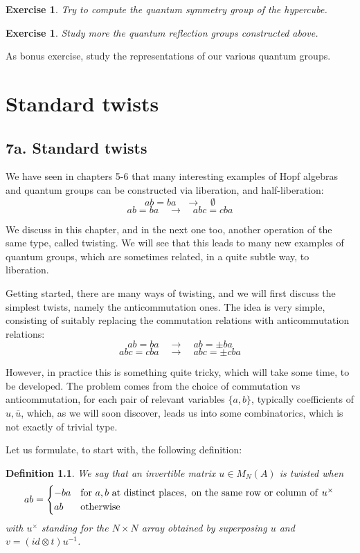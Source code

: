 \documentclass[12pt]{amsbook}
\newtheorem{definition}[theorem]{Definition}
\newtheorem{exercise}[theorem]{Exercise}
\begin{document}
\begin{exercise}
Try to compute the quantum symmetry group of the hypercube.
\end{exercise}

\begin{exercise}
Study more the quantum reflection groups constructed above.
\end{exercise}

As bonus exercise, study the representations of our various quantum groups.

\chapter{Standard twists}

\section*{7a. Standard twists}

We have seen in chapters 5-6 that many interesting examples of Hopf algebras and quantum groups can be constructed via liberation, and half-liberation:
$$ab=ba\quad\to\quad\emptyset$$
$$ab=ba\quad\to\quad abc=cba$$

We discuss in this chapter, and in the next one too, another operation of the same type, called twisting. We will see that this leads to many new examples of quantum groups, which are sometimes related, in a quite subtle way, to liberation.

\bigskip

Getting started, there are many ways of twisting, and we will first discuss the simplest twists, namely the anticommutation ones. The idea is very simple, consisting of suitably replacing the commutation relations with anticommutation relations:
$$ab=ba\quad\to\quad ab=\pm ba$$
$$abc=cba\quad\to\quad abc=\pm cba$$

However, in practice this is something quite tricky, which will take some time, to be developed. The problem comes from the choice of commutation vs anticommutation, for each pair of relevant variables $\{a,b\}$, typically coefficients of $u,\bar{u}$, which, as we will soon discover, leads us into some combinatorics, which is not exactly of trivial type. 

\bigskip

Let us formulate, to start with, the following definition:

\begin{definition}
We say that an invertible matrix $u\in M_N(A)$ is twisted when
$$ab=\begin{cases}
-ba&{\rm for}\ a,b\ {\rm at\ distinct\ places,\ on\ the\ same\ row\ or\ column\ of\ }u^\times\\
ab&{\rm otherwise}
\end{cases}$$
with $u^\times$ standing for the $N\times N$ array obtained by superposing $u$ and $v=(id\otimes t)u^{-1}$.
\end{definition}
\end{document}

